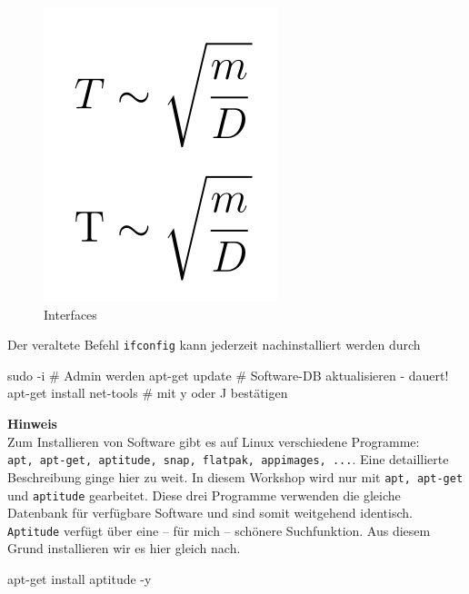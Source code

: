 \documentclass[
  letterpaper,
  DIV=11]{scrreprt}
\newenvironment{Shaded}{\begin{snugshade}}{\end{snugshade}}
\newcommand{\AttributeTok}[1]{\textcolor[rgb]{0.40,0.45,0.13}{#1}}
\newcommand{\CommentTok}[1]{\textcolor[rgb]{0.37,0.37,0.37}{#1}}
\newcommand{\ExtensionTok}[1]{\textcolor[rgb]{0.00,0.23,0.31}{#1}}
\newcommand{\FunctionTok}[1]{\textcolor[rgb]{0.28,0.35,0.67}{#1}}
\newcommand{\NormalTok}[1]{\textcolor[rgb]{0.00,0.23,0.31}{#1}}
\begin{document}
\begin{figure}[H]

{\centering \includegraphics{bilder/inst/interfaces.png}

}

\caption{Interfaces}

\end{figure}%

Der veraltete Befehl \texttt{ifconfig} kann jederzeit nachinstalliert
werden durch

\begin{Shaded}
\begin{Highlighting}[]
\FunctionTok{sudo} \AttributeTok{{-}i}           \CommentTok{\# Admin werden}
\ExtensionTok{apt{-}get}\NormalTok{ update    }\CommentTok{\# Software{-}DB aktualisieren {-} dauert!}
\ExtensionTok{apt{-}get}\NormalTok{ install net{-}tools  }\CommentTok{\# mit y oder J bestätigen}
\end{Highlighting}
\end{Shaded}

\samplestart

\textbf{Hinweis}\\
Zum Installieren von Software gibt es auf Linux verschiedene Programme:
\texttt{apt,\ apt-get,\ aptitude,\ snap,\ flatpak,\ appimages,\ ...}.
Eine detaillierte Beschreibung ginge hier zu weit. In diesem Workshop
wird nur mit \texttt{apt,\ apt-get} und \texttt{aptitude} gearbeitet.
Diese drei Programme verwenden die gleiche Datenbank für verfügbare
Software und sind somit weitgehend identisch. \texttt{Aptitude} verfügt
über eine -- für mich -- schönere Suchfunktion. Aus diesem Grund
installieren wir es hier gleich nach. \sampleend

\begin{Shaded}
\begin{Highlighting}[]
\ExtensionTok{apt{-}get}\NormalTok{ install aptitude }\AttributeTok{{-}y}
\end{Highlighting}
\end{Shaded}
\end{document}

